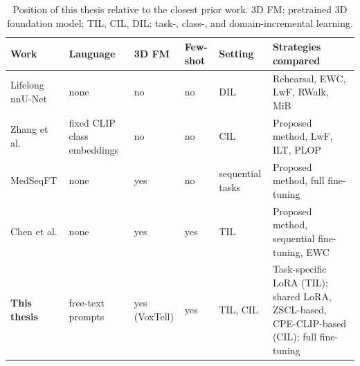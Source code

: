 \begin{table}[tb]
\centering
\small
\setlength{\tabcolsep}{4pt}
\renewcommand{\arraystretch}{1.15}
\caption{Position of this thesis relative to the closest prior work. 3D FM: pretrained 3D foundation model; TIL, CIL, DIL: task-, class-, and domain-incremental learning.}
\label{tab:positioning}
\begin{tabular}{@{}L{2.7cm}L{2.3cm}L{1.9cm}L{1.7cm}L{1.9cm}L{4.0cm}@{}}
\toprule
\textbf{Work} & \textbf{Language} & \textbf{3D FM} & \textbf{Few-shot} & \textbf{Setting} & \textbf{Strategies compared}\\
\midrule
Lifelong nnU-Net\newline \cite{gonzalez2023lifelong} & none & no & no & DIL & Rehearsal, EWC, LwF, RWalk, MiB\\
\cmidrule(lr){1-6}
Zhang et al.\newline \cite{zhang2023continuallearningabdominalmultiorgan} & fixed CLIP class embeddings & no & no & CIL & Proposed method, LwF, ILT, PLOP\\
\cmidrule(lr){1-6}
MedSeqFT\newline [MedSeqFT] & none & yes & no & sequential tasks & Proposed method, full fine-tuning\\
\cmidrule(lr){1-6}
Chen et al.\newline [Che+26] & none & yes & yes & TIL & Proposed method, sequential fine-tuning, EWC\\
\midrule
\textbf{This thesis} & free-text prompts & yes (VoxTell) & yes & TIL, CIL & Task-specific LoRA (TIL); shared LoRA, ZSCL-based, CPE-CLIP-based (CIL); full fine-tuning\\
\bottomrule
\end{tabular}
\end{table}
